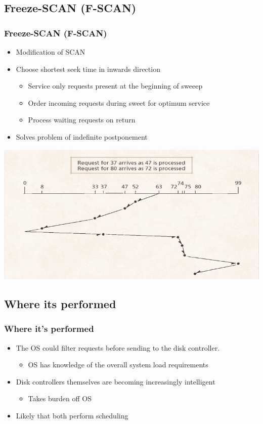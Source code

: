 \documentclass{beamer}
\begin{document}
\subsection{Freeze-SCAN (F-SCAN)}
\begin{frame}
\frametitle{Freeze-SCAN (F-SCAN)}
\begin{itemize}
\item Modification of SCAN
\item Choose shortest seek time in inwards direction
\begin{itemize}
\item Service only requests present at the beginning of sweeep
\item Order incoming requests during sweet for optimum service
\item Process waiting requests on return
\end{itemize}
\item Solves problem of indefinite postponement
\end{itemize}
\includegraphics[scale=0.35]{fscan.png}
\end{frame}
\subsection{Where its performed}
\begin{frame}
\frametitle{Where it's performed}
\begin{itemize}
\item The OS could filter requests before sending to the disk controller.
\begin{itemize}
\item OS has knowledge of the overall system load requirements
\end{itemize}
\item Disk controllers themselves are becoming increasingly intelligent
\begin{itemize}
\item Takes burden off OS
\end{itemize}
\item Likely that both perform scheduling
\end{itemize}
\end{frame}
\end{document}
